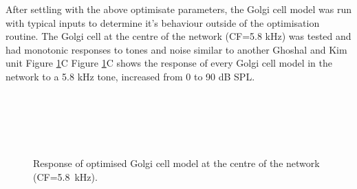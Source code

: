 After settling with the above optimisate parameters, the Golgi cell model was
run with typical inputs to determine it's behaviour outside of the optimisation
routine.  The Golgi cell at the centre of the network (CF=5.8 kHz) was tested
and had monotonic responses to tones and noise similar to another Ghoshal and
Kim unit Figure \ref{fig:Golgi_verification}C Figure
\ref{fig:Golgi_verification}C shows the response of every Golgi cell model in
the network to a 5.8 kHz tone, increased from 0 to 90 dB SPL.
\begin{figure}[htb]
  \centering
  \hspace{0.5\textwidth}\hfill\\
  \\
  \hfill\\
  \\
 \label{fig:Golgi_verification}
 \caption{Response of optimised Golgi cell model at the centre of the network (CF=5.8~kHz).}
\end{figure}





